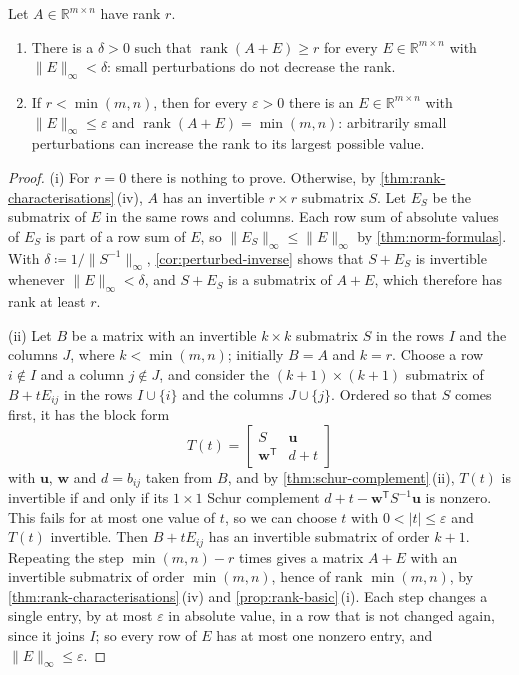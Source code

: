 \begin{proposition}
\label{prop:rank-perturbation}
Let $A\in\mathbb R^{m\times n}$ have rank $r$.
\begin{enumerate}
\item There is a $\delta>0$ such that $\operatorname{rank}(A+E)\ge r$ for every $E\in\mathbb R^{m\times n}$ with $\|E\|_\infty<\delta$: small perturbations do not decrease the rank.
\item If $r<\min(m,n)$, then for every $\varepsilon>0$ there is an $E\in\mathbb R^{m\times n}$ with $\|E\|_\infty\le\varepsilon$ and $\operatorname{rank}(A+E)=\min(m,n)$: arbitrarily small perturbations can increase the rank to its largest possible value.
\end{enumerate}
\end{proposition}

\begin{proof}
(i) For $r=0$ there is nothing to prove. Otherwise, by \cref{thm:rank-characterisations}\,(iv), $A$ has an invertible $r\times r$ submatrix $S$. Let $E_S$ be the submatrix of $E$ in the same rows and columns. Each row sum of absolute values of $E_S$ is part of a row sum of $E$, so $\|E_S\|_\infty\le\|E\|_\infty$ by \cref{thm:norm-formulas}. With $\delta\coloneqq1/\|S^{-1}\|_\infty$, \cref{cor:perturbed-inverse} shows that $S+E_S$ is invertible whenever $\|E\|_\infty<\delta$, and $S+E_S$ is a submatrix of $A+E$, which therefore has rank at least $r$.

(ii) Let $B$ be a matrix with an invertible $k\times k$ submatrix $S$ in the rows $I$ and the columns $J$, where $k<\min(m,n)$; initially $B=A$ and $k=r$. Choose a row $i\notin I$ and a column $j\notin J$, and consider the $(k+1)\times(k+1)$ submatrix of $B+tE_{ij}$ in the rows $I\cup\{i\}$ and the columns $J\cup\{j\}$. Ordered so that $S$ comes first, it has the block form
\[
T(t)=\begin{bmatrix}S&\mathbf u\\\mathbf w^{\mathsf T}&d+t\end{bmatrix}
\]
with $\mathbf u$, $\mathbf w$ and $d=b_{ij}$ taken from $B$, and by \cref{thm:schur-complement}\,(ii), $T(t)$ is invertible if and only if its $1\times1$ Schur complement $d+t-\mathbf w^{\mathsf T}S^{-1}\mathbf u$ is nonzero. This fails for at most one value of $t$, so we can choose $t$ with $0<|t|\le\varepsilon$ and $T(t)$ invertible. Then $B+tE_{ij}$ has an invertible submatrix of order $k+1$. Repeating the step $\min(m,n)-r$ times gives a matrix $A+E$ with an invertible submatrix of order $\min(m,n)$, hence of rank $\min(m,n)$, by \cref{thm:rank-characterisations}\,(iv) and \cref{prop:rank-basic}\,(i). Each step changes a single entry, by at most $\varepsilon$ in absolute value, in a row that is not changed again, since it joins $I$; so every row of $E$ has at most one nonzero entry, and $\|E\|_\infty\le\varepsilon$.
\end{proof}

